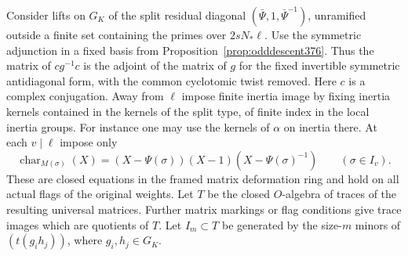 \documentclass[a4paper,11pt]{article}
\theoremstyle{definition}
\theoremstyle{remark}
\numberwithin{equation}{section}
\begin{document}
Consider lifts on \(G_K\) of the split residual diagonal
\((\bar\Psi,1,\bar\Psi^{-1})\), unramified outside a finite
set containing the primes over \(2sN_*\ell\). Use the
symmetric adjunction in a fixed basis from
Proposition~\ref{prop:odddescent376}. Thus the matrix of
\(cg^{-1}c\) is the adjoint of the matrix of \(g\) for the
fixed invertible symmetric antidiagonal form, with the
common cyclotomic twist removed. Here \(c\) is a complex
conjugation. Away from \(\ell\) impose finite inertia image
by fixing inertia kernels contained in the kernels of the
split type, of finite index in the local inertia groups.
For instance one may use the kernels of \(\alpha\) on
inertia there. At each \(v\mid\ell\) impose only
\[
  \operatorname{char}_{M(\sigma)}(X)
     =(X-\Psi(\sigma))(X-1)(X-\Psi(\sigma)^{-1})
          \qquad(\sigma\in I_v).
\]
These are closed equations in the framed matrix deformation
ring and hold on all actual flags of the original weights.
Let \(T\) be the closed \(O\)-algebra of traces of the
resulting universal matrices. Further matrix markings or
flag conditions give trace images which are quotients of
\(T\). Let \(I_m\subset T\) be generated by the size-\(m\)
minors of \((t(g_i h_j))\), where \(g_i,h_j\in G_K\).
\end{document}
